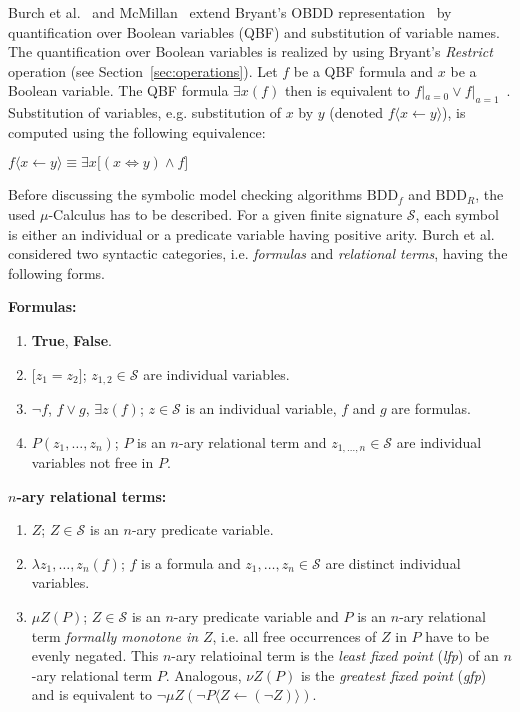 \documentclass{vldb}
\begin{document}
Burch et al.~\cite{BURCH90} and McMillan~\cite{MCMILLAN92} extend Bryant's OBDD
representation~\cite{BRYANT86} by quantification over Boolean variables (QBF) and
substitution of variable names. The quantification over Boolean variables is
realized by using Bryant's \textit{Restrict} operation (see
Section~\ref{sec:operations}). Let $f$ be a QBF formula and $x$ be a Boolean
variable. The QBF formula $\exists x\left(f\right)$ then is equivalent to
$f|_{a=0} \lor f|_{a=1}$~\cite{BURCH90}. Substitution of variables, e.g.
substitution of $x$ by $y$ (denoted $f\langle x\leftarrow y\rangle$), is computed
using the following equivalence:
\begin{center}
$
f\langle x\leftarrow y\rangle \equiv
\exists x\lbrack\left(x \Leftrightarrow y\right) \land f\rbrack
$
\end{center}

Before discussing the symbolic model checking algorithms $\text{BDD}_f$ and
$\text{BDD}_R$, the used $\mu$-Calculus has to be described. For a given finite
signature $\mathcal{S}$, each symbol is either an individual or a predicate
variable having positive arity. Burch et al.~\cite{BURCH90} considered two
syntactic categories, i.e. \textit{formulas} and \textit{relational terms}, having
the following forms.

\noindent
\textbf{Formulas:}~\cite{BURCH90}
\begin{enumerate}
    \item{\textbf{True}, \textbf{False}}.
    \item{
        $\lbrack z_1 = z_2 \rbrack$; $z_{1, 2}\in\mathcal{S}$ are individual
        variables.
    }
    \item{
        $\neg f$, $f \lor g$, $\exists z\left( f \right)$; $z\in\mathcal{S}$ is
        an individual variable, $f$ and $g$ are formulas.
    }
    \item{
        $P\left(z_1, \ldots, z_n\right)$; $P$ is an $n$-ary relational term and
        \newline $z_{1, \ldots, n}\in\mathcal{S}$ are individual variables not
        free in $P$.
    }
\end{enumerate}
\textbf{$n$-ary relational terms:}~\cite{BURCH90}
\begin{enumerate}
    \item{$Z$; $Z\in\mathcal{S}$ is an $n$-ary predicate variable.}
    \item{
        $\lambda z_1, \ldots, z_n\left( f \right)$; $f$ is a formula and
        $z_1, \ldots, z_n\in\mathcal{S}$ are distinct individual variables.
    }
    \item{
        $\mu Z \left( P \right)$; $Z\in\mathcal{S}$ is an $n$-ary predicate variable
        and $P$ is an $n$-ary relational term \textit{formally monotone in} $Z$,
        i.e. all free occurrences of $Z$ in $P$ have to be evenly negated. This
        $n$-ary relatioinal term is the \textit{least fixed point} (\textit{lfp})
        of an $n$-ary relational term $P$. Analogous, $\nu Z \left( P \right)$ is
        the \textit{greatest fixed point} (\textit{gfp}) and is equivalent to
        $\neg\mu Z \left( \neg P \langle Z \leftarrow \left( \neg Z \right) \rangle \right)$.
    }
\end{enumerate}
\end{document}
